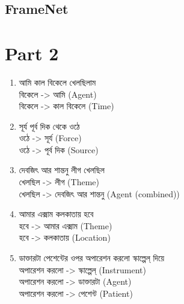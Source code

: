 \documentclass[11pt,a4paper,twocolumn]{article}
\begin{document}
	\subsection{FrameNet}
	
	
	\section{Part 2}
	{\bg
	\begin{enumerate}
		
		\item আমি কাল বিকেলে খেলছিলাম\\
		\textcolor{hlit}{বিকেলে} -> \textcolor{rlit}{আমি} (Agent)\\
		\textcolor{hlit}{বিকেলে} -> \textcolor{rlit}{কাল বিকেলে} (Time)\\
				
		
		\item সূর্য পূর্ব দিক থেকে ওঠে \\
		\textcolor{hlit}{ওঠে} -> \textcolor{rlit}{সূর্য} (Force)\\
		\textcolor{hlit}{ওঠে} -> \textcolor{rlit}{পূর্ব দিক} (Source)\\
				
		\item দেবজিৎ আর শান্তনু লীগ খেলছিল \\
		\textcolor{hlit}{খেলছিল} -> \textcolor{rlit}{লীগ} (Theme)\\
		\textcolor{hlit}{খেলছিল} -> \textcolor{rlit}{দেবজিৎ আর শান্তনু} (Agent (combined))\\
				
		\item আমার এক্সাম কলকাতায় হবে \\
		\textcolor{hlit}{হবে} -> \textcolor{rlit}{আমার এক্সাম} (Theme)\\
		\textcolor{hlit}{হবে } -> \textcolor{rlit}{কলকাতায়} (Location)\\
				
		\item ডাক্তারটা পেশেন্টের ওপর অপারেশন করলো স্কাল্পেল্ দিয়ে \\
		\textcolor{hlit}{অপারেশন করলো} -> \textcolor{rlit}{স্কাল্পেল্} (Instrument)\\
		\textcolor{hlit}{অপারেশন করলো} -> \textcolor{rlit}{ডাক্তারটা} (Agent)\\
		\textcolor{hlit}{অপারেশন করলো} -> \textcolor{rlit}{পেশেন্ট} (Patient)\\
				
	\end{enumerate}		
	}	
	
\end{document}
